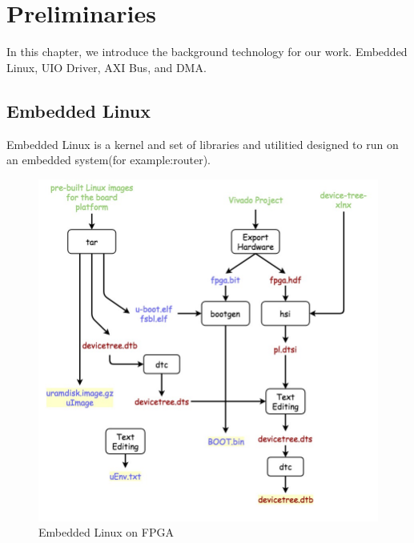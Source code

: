\chapter{Preliminaries}
\label{cha:Preliminaries}
In this chapter, we introduce the background technology for our work. 
Embedded Linux, UIO Driver, AXI Bus, and DMA.



\section{Embedded Linux}
\label{sec:Embedded Linux}

Embedded Linux is a kernel and set of libraries and utilitied designed to run
on an embedded system(for example:router). 
\begin{figure}[!htb]
  \centering
  \includegraphics[scale=0.5]{images/embedded_linux.jpg}
  \caption[Embedded Linux on FPGA]{Embedded Linux on FPGA}
  \label{fig:Embedded Linux on FPGA}
\end{figure}


